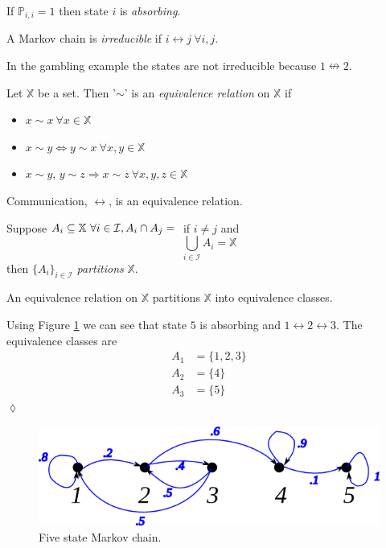 \documentclass[lecture,12pt,]{pcms-l}
\begin{document}
\begin{definition}
If $\mathbb{P}_{i,i}=1$ then state $i$ is \textit{absorbing}.
\end{definition}

\begin{definition}
A Markov chain is \textit{irreducible} if $i\leftrightarrow j ~\forall i,j$.
\end{definition}
In the gambling example the states are not irreducible because $1\nleftrightarrow 2$.

\begin{definition}
Let $\mathbb{X}$ be a set. Then '$\sim$' is an \textit{equivalence relation} on $\mathbb{X}$ if
\begin{itemize}
\item $x\sim x ~\forall x\in\mathbb{X}$
\item $x\sim y \Leftrightarrow y\sim x ~\forall x,y\in\mathbb{X}$
\item $x\sim y$, $y\sim z \Rightarrow x\sim z ~\forall x,y,z\in\mathbb{X}$
\end{itemize}
\end{definition}

\begin{theorem}
Communication, $\leftrightarrow$, is an equivalence relation.
\end{theorem}

\begin{definition}
Suppose $A_i\subseteq \mathbb{X} ~\forall i\in\mathcal{I}, A_i\cap A_j=\null$ if $i\neq j$ and
$$\bigcup_{i\in\mathcal{I}}A_i = \mathbb{X}$$
then $\{A_i\}_{i\in\mathcal{I}}$ \textit{partitions} $\mathbb{X}$.
\end{definition}

\begin{theorem}
An equivalence relation on $\mathbb{X}$ partitions $\mathbb{X}$ into equivalence classes.
\end{theorem}

\begin{example}
Using Figure \ref{fig:09mc5} we can see that state $5$ is absorbing and $1\leftrightarrow 2\leftrightarrow 3$. The equivalence classes are
\begin{align*}
A_1 &= \{1,2,3\} \\
A_2 &= \{4\} \\
A_3 &= \{5\}
\end{align*}
$\lozenge$
\end{example}

\begin{figure}[ht!]
	\centering
	\includegraphics[width=.4\textwidth]{images/09mc5}
	\caption{Five state Markov chain.}
	\label{fig:09mc5}
\end{figure}
\end{document}
